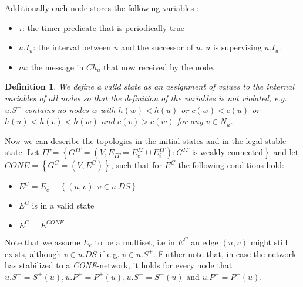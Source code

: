 \documentclass[11pt]{article}
\newtheorem{definition}[theorem]{Definition}
\begin{document}
Additionally each node stores the following variables :
\begin{itemize}\itemsep0.1pt

\item $\tau$: the timer predicate that is periodically true

\item $u.I_u$: the interval between $u$ and the successor of $u$. $u$ is supervising $u.I_u$.

\item $m$: the  message in $Ch_u$ that now received by the node.

\end{itemize}

\begin{definition}\label{def:valid}
We define a valid state as an assignment of values to the internal variables of all nodes so that the definition of the variables is not violated, e.g. $u.S^+$ contains no nodes $w$ with $h(w)<h(u)$ or $c(w)<c(u)$ or $h(u)<h(v)<h(w)$ and $c(v)>c(w)$ for any $v\in N_u$.
\end{definition}

Now we can describe the topologies in the initial states and in the legal stable state. Let $IT=\left\{G^{IT}=(V,E_{IT}=E^{IT}_e \cup E^{IT}_i):G^{IT}\text{ is weakly connected}\right\}$ and let $CONE=\left\{G^{C}=\left(V, E^{C}\right)\right\}$, such that for $E^{C}$ the following conditions hold:

\begin{itemize}
  \item $E^{C}=E_e-\left\{(u,v): v\in u.DS\right\}$
  \item $E^{C}$ is in a valid state
  \item $E^{C}=E^{CONE}$
\end{itemize}

Note that we assume $E_e$ to be a multiset, i.e in $E^{C}$ an edge $(u,v)$ might still exists, although $v \in u.DS$ if e.g. $v \in u.S^+$.
Further note that, in case the network has stabilized to a \emph{CONE}-network, it holds for every node that $u.S^+=S^+(u),u.P^+=P^+(u),u.S^-=S^-(u)$ and $u.P^-=P^-(u)$.
\end{document}
